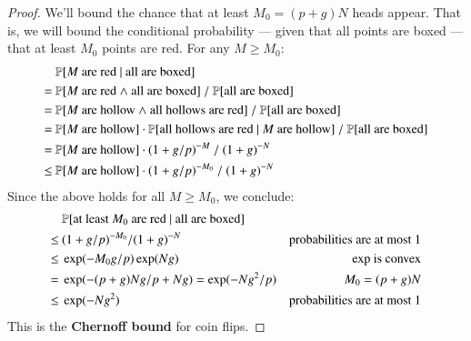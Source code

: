 \documentclass[openany, notitlepage, justified]{tufte-book}
\theoremstyle{plain}
\theoremstyle{definition}
\begin{document}
\begin{proof}
            We'll bound the chance that at least $M_0 = (p+g)N$ heads
            appear.  That is, we will bound the conditional probability ---
            given that all points are boxed --- that at least $M_0$
            points are red. 
            For any $M\geq M_0$:
            \begin{align*}
                    & ~ \mathbb{P}[\text{$M$ are red $\mid$ all are boxed}] \\
                  = & ~ \mathbb{P}[\text{$M$ are red $\wedge$ all are boxed}] ~/~ 
                        \mathbb{P}[\text{all are boxed}]  \\
                  = & ~ \mathbb{P}[\text{$M$ are hollow $\wedge$ all hollows are red}] ~/~ 
                        \mathbb{P}[\text{all are boxed}]  \\
                  = & ~ \mathbb{P}[\text{$M$ are hollow}] \cdot
                        \mathbb{P}[\text{all hollows are red $\mid$ $M$ are hollow}] ~/~
                        \mathbb{P}[\text{all are boxed}] \\
                  = & ~ \mathbb{P}[\text{$M$ are hollow}] \cdot (1+g/p)^{-M} ~/~ (1+g)^{-N}  \\
                \leq& ~ \mathbb{P}[\text{$M$ are hollow}] \cdot (1+g/p)^{-M_0} ~/~ (1+g)^{-N} 
            \end{align*}
            Since the above holds for all $M\geq M_0$, we conclude:
            \begin{align*}
                ~   & ~ \mathbb{P}[\text{at least $M_0$ are red $\mid$ all are boxed}] & \\
                \leq& ~ (1+g/p)^{-M_0} / (1+g)^{-N}             & \text{probabilities are at most $1$} \\
                \leq& ~ \exp(-M_0 g/p) \exp(Ng)                 & \text{$\exp$ is convex} \\ 
                =   & ~ \exp(-(p+g)N g/p + Ng) = \exp(-Ng^2/p)  & \text{$M_0=(p+g)N$} \\ 
                \leq& ~ \exp(-Ng^2)                             & \text{probabilities are at most $1$}
            \end{align*}
            This is the \textbf{Chernoff bound} for coin flips.
        \end{proof}
\end{document}
